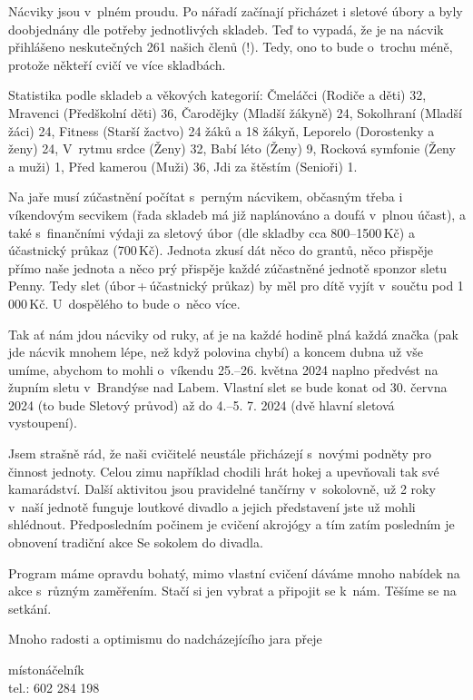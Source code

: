 \documentclass[11pt]{article}
\begin{document}
Nácviky jsou v~plném proudu. Po nářadí začínají přicházet i sletové úbory a byly doobjednány dle potřeby jednotlivých skladeb. Teď to vypadá, že je na nácvik přihlášeno neskutečných 261 našich členů (!). Tedy, ono to bude o~trochu méně, protože někteří cvičí ve více skladbách.

Statistika podle skladeb a věkových kategorií: Čmeláčci (Rodiče a děti) 32, Mravenci (Předškolní děti) 36, Čarodějky (Mladší žákyně) 24, Sokolhraní (Mladší žáci) 24, Fitness (Starší žactvo) 24 žáků a 18 žákyň, Leporelo (Dorostenky a ženy) 24, V~rytmu srdce (Ženy) 32, Babí léto (Ženy) 9, Rocková symfonie (Ženy a muži) 1, Před kamerou (Muži) 36, Jdi za štěstím (Senioři) 1.

Na jaře musí zúčastnění počítat s~perným nácvikem, občasným třeba i víkendovým secvikem (řada skladeb má již naplánováno a doufá v~plnou účast), a také s~finančními výdaji za sletový úbor (dle skladby cca 800–1500\,Kč) a účastnický průkaz (700\,Kč). Jednota zkusí dát něco do grantů, něco přispěje přímo naše jednota a něco prý přispěje každé zúčastněné jednotě sponzor sletu Penny. Tedy slet (úbor\,+\,účastnický průkaz) by měl pro dítě vyjít v~součtu pod 1 000\,Kč. U~dospělého to bude o~něco více.  

Tak ať nám jdou nácviky od ruky, ať je na každé hodině plná každá značka (pak jde nácvik mnohem lépe, než když polovina chybí) a koncem dubna už vše umíme, abychom to mohli o~víkendu 25.–⁠⁠⁠⁠⁠26. května 2024 naplno předvést na župním sletu v~Brandýse nad Labem. Vlastní slet se bude konat od 30. června 2024 (to bude Sletový průvod) až do 4.–⁠⁠⁠⁠⁠5. 7. 2024 (dvě hlavní sletová vystoupení).

Jsem strašně rád, že naši cvičitelé neustále přicházejí s~novými podněty pro činnost jednoty. Celou zimu například chodili hrát hokej a upevňovali tak své kamarádství. Další aktivitou jsou pravidelné tančírny v~sokolovně, už 2 roky v~naší jednotě funguje loutkové divadlo a jejich představení jste už mohli shlédnout. Předposledním počinem je cvičení akrojógy a tím zatím posledním je obnovení tradiční akce Se sokolem do divadla.

Program máme opravdu bohatý, mimo vlastní cvičení dáváme mnoho nabídek na akce s~různým zaměřením. Stačí si jen vybrat a připojit se k~nám. Těšíme se na setkání.

Mnoho radosti a optimismu do nadcházejícího jara přeje

\signature{Jiří Novák (Jirkan)}{místonáčelník\\tel.: 602 284 198}
\end{document}
